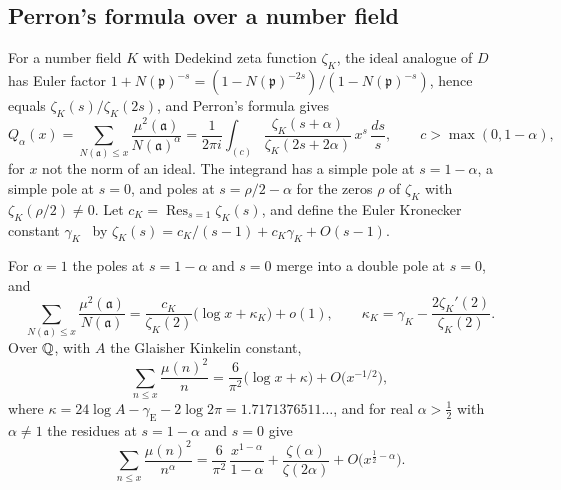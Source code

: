 \subsection{Perron's formula over a number field}
For a number field $K$ with Dedekind zeta function $\zeta_K$, the ideal analogue of $D$ has Euler factor $1+N(\mathfrak{p})^{-s}=(1-N(\mathfrak{p})^{-2s})/(1-N(\mathfrak{p})^{-s})$, hence equals $\zeta_K(s)/\zeta_K(2s)$, and Perron's formula gives
\begin{equation}\label{eq:sf:perron}
Q_\alpha(x)=\sum_{N(\mathfrak{a})\le x}\frac{\mu^2(\mathfrak{a})}{N(\mathfrak{a})^\alpha}=\frac{1}{2\pi i}\int_{(c)}\frac{\zeta_K(s+\alpha)}{\zeta_K(2s+2\alpha)}\,x^s\,\frac{ds}{s},\qquad c>\max(0,1-\alpha),
\end{equation}
for $x$ not the norm of an ideal. The integrand has a simple pole at $s=1-\alpha$, a simple pole at $s=0$, and poles at $s=\rho/2-\alpha$ for the zeros $\rho$ of $\zeta_K$ with $\zeta_K(\rho/2)\ne0$. Let $c_K=\operatorname{Res}_{s=1}\zeta_K(s)$, and define the Euler Kronecker constant $\gamma_K$~\cite{ihara2006} by $\zeta_K(s)=c_K/(s-1)+c_K\gamma_K+O(s-1)$.

\begin{proposition}\label{prop:sf:classical}
For $\alpha=1$ the poles at $s=1-\alpha$ and $s=0$ merge into a double pole at $s=0$, and
\begin{equation}\label{eq:sf:alpha1K}
\sum_{N(\mathfrak{a})\le x}\frac{\mu^2(\mathfrak{a})}{N(\mathfrak{a})}=\frac{c_K}{\zeta_K(2)}\bigl(\log x+\kappa_K\bigr)+o(1),\qquad \kappa_K=\gamma_K-\frac{2\zeta_K'(2)}{\zeta_K(2)} .
\end{equation}
Over $\mathbb{Q}$, with $A$ the Glaisher Kinkelin constant,
\begin{equation}\label{eq:sf:final}
\sum_{n\le x}\frac{\mu(n)^2}{n}=\frac{6}{\pi^2}\bigl(\log x+\kappa\bigr)+O\bigl(x^{-1/2}\bigr),
\end{equation}
where $\kappa=24\log A-\gamma_{\mathrm E}-2\log2\pi=1.7171376511\ldots$, and for real $\alpha>\frac12$ with $\alpha\ne1$ the residues at $s=1-\alpha$ and $s=0$ give
\[
\sum_{n\le x}\frac{\mu(n)^2}{n^\alpha}=\frac{6}{\pi^2}\,\frac{x^{1-\alpha}}{1-\alpha}+\frac{\zeta(\alpha)}{\zeta(2\alpha)}+O\bigl(x^{\frac12-\alpha}\bigr).
\]
\end{proposition}


